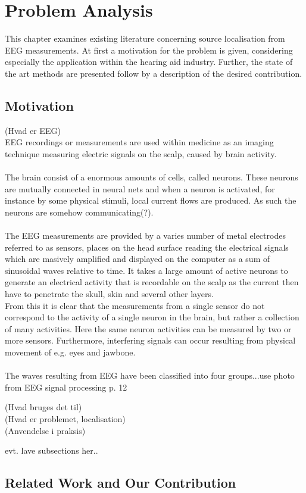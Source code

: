 \chapter{Problem Analysis}
This chapter examines existing literature concerning source localisation from EEG measurements. At first a motivation for the problem is given, considering especially the application within the hearing aid industry. Further, the state of the art methods are presented follow by a description of the desired contribution. 

\section{Motivation}
(Hvad er EEG)\\
EEG recordings or measurements are used within medicine as an imaging technique measuring electric signals on the scalp, caused by brain activity. \\
\\
The brain consist of a enormous amounts of cells, called neurons. These neurons are mutually connected in neural nets and when a neuron is activated, for instance by some physical stimuli, local current flows are produced\cite{fundamentalEEG}. As such the neurons are somehow communicating(?). \\
\\
The EEG measurements are provided by a varies number of metal electrodes referred to as sensors, places on the head surface reading the electrical signals which are masively amplified and displayed on the computer as a sum of sinusoidal waves relative to time.
It takes a large amount of active neurons to generate an electrical activity that is recordable on the scalp as the current then have to penetrate the skull, skin and several other layers.  \\
From this it is clear that the measurements from a single sensor do not correspond to the activity of a single neuron in the brain, but rather a collection of many activities. Here the same neuron activities can be measured by two or more sensors. Furthermore, interfering signals can occur resulting from physical movement of e.g. eyes and jawbone\cite{fundamentalEEG}.\\
\\
The waves resulting from EEG have been classified into four groups...use photo from EEG signal processing p. 12 

(Hvad bruges det til)\\


(Hvad er problemet, localisation)\\

(Anvendelse i praksis)

evt. lave subsections her..

\section{Related Work and Our Contribution } 





 
